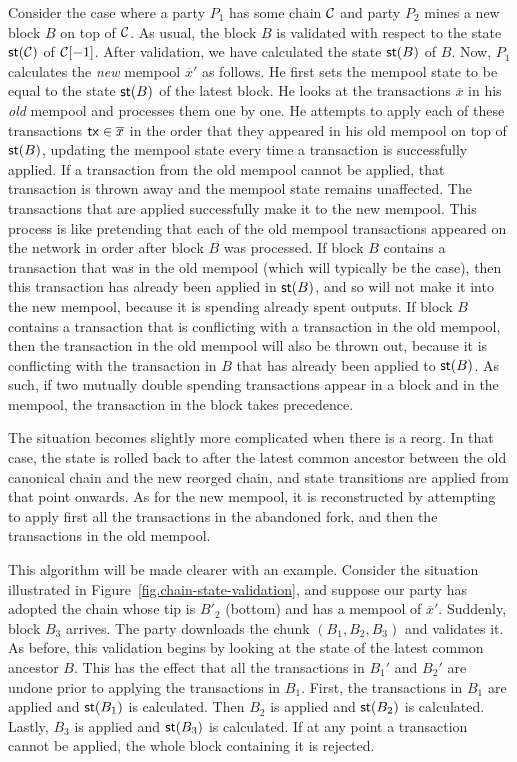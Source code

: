 Consider the case where a party $P_1$ has some chain $\mathcal{C}$ and party $P_2$ mines a new
block $B$ on top of $\mathcal{C}$. As usual, the block $B$ is validated with respect to the state
$\mathsf{st}(\mathcal{C})$ of $\mathcal{C}[-1]$. After validation, we have calculated the state $\mathsf{st}(B)$ of $B$.
Now, $P_1$ calculates the \emph{new} mempool $\overline{x}'$ as follows.
He first sets the mempool state to be equal to the state $\mathsf{st}(B)$ of the latest block.
He looks at the transactions $\overline{x}$ in his \emph{old} mempool and processes them
one by one. He attempts to apply each of these transactions $\mathsf{tx} \in \overline{x}$ in the
order that they appeared in his old mempool on top of $\mathsf{st}(B)$, updating the mempool state every time
a transaction is successfully applied. If a transaction from the old mempool
cannot be applied, that transaction is thrown away and the mempool state remains unaffected.
The transactions that are applied successfully
make it to the new mempool. This process is like pretending that each of the old mempool transactions
appeared on the network in order after block $B$ was processed. If block $B$ contains a transaction
that was in the old mempool (which will typically be the case), then this transaction has already
been applied in $\mathsf{st}(B)$, and so will not make it into the new mempool, because it is spending already
spent outputs. If block $B$ contains a transaction that is conflicting with a transaction
in the old mempool, then the transaction in the old mempool will also be thrown out, because it
is conflicting with the transaction in $B$ that has already been applied to $\mathsf{st}(B)$.
As such, if two mutually double spending transactions appear in a block and in the mempool,
the transaction in the block takes precedence.

The situation becomes slightly more complicated when there is a reorg. In that case, the
state is rolled back to after the latest common ancestor between the old canonical chain and
the new reorged chain, and state transitions are applied from that point onwards. As for the
new mempool, it is reconstructed by attempting to apply first all the transactions in the
abandoned fork, and then the transactions in the old mempool.

This algorithm will be made clearer with an example. Consider the situation illustrated in
Figure~\ref{fig.chain-state-validation}, and suppose our party has adopted the chain
whose tip is $B'_2$ (bottom) and has a mempool of $\overline{x}'$. Suddenly, block $B_3$
arrives. The party downloads the chunk $(B_1, B_2, B_3)$ and validates it. As before,
this validation begins by looking at the state of the latest common ancestor $B$.
This has the effect that all the transactions in $B_1'$ and $B_2'$ are undone
prior to applying the transactions in $B_1$.
First, the transactions in $B_1$ are applied and $\mathsf{st}(B_1)$ is calculated. Then
$B_2$ is applied and $\mathsf{st}(B_2)$ is calculated. Lastly, $B_3$ is applied and $\mathsf{st}(B_3)$
is calculated. If at any point a transaction cannot be applied, the whole block containing
it is rejected.

